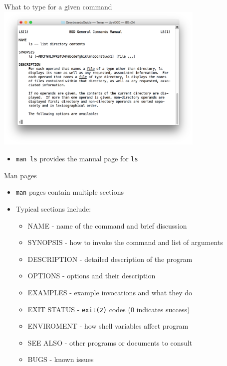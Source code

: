 \documentclass[t]{beamer}
\begin{document}
\begin{frame}{What to type for a given command}
  \includegraphics[width=10cm,scale=0.4]{images/newtty-3.png}

  \begin{itemize}
  \item \texttt{man ls} provides the manual page for \texttt{ls}
  \end{itemize}
  \note{}
\end{frame}

\begin{frame}{Man pages}
  \begin{itemize}
  \item \texttt{man} pages contain multiple sections
  \item Typical sections include:
    \begin{itemize}
    \item NAME - name of the command and brief discussion
    \item SYNOPSIS - how to invoke the command and list of arguments
    \item DESCRIPTION - detailed description of the program
    \item OPTIONS - options and their description
    \item EXAMPLES - example invocations and what they do
    \item EXIT STATUS - \texttt{exit(2)} codes (0 indicates success) 
    \item ENVIROMENT - how shell variables affect program
    \item SEE ALSO - other programs or documents to consult
    \item BUGS - known issues
    \end{itemize}
  \end{itemize}
  \note{}
\end{frame}
\end{document}
